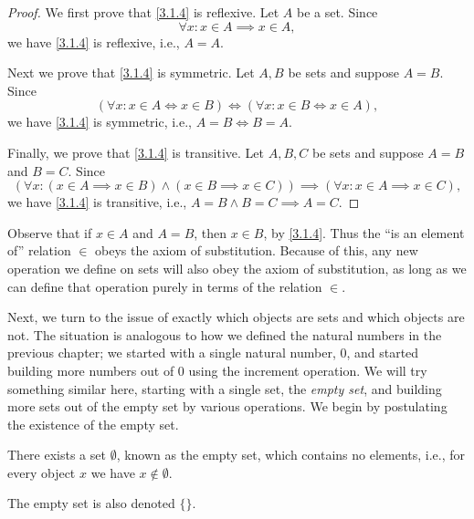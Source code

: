 \begin{proof}
  We first prove that \cref{3.1.4} is reflexive.
  Let \(A\) be a set.
  Since
  \[
    \forall x : x \in A \implies x \in A,
  \]
  we have \cref{3.1.4} is reflexive, i.e., \(A = A\).

  Next we prove that \cref{3.1.4} is symmetric.
  Let \(A, B\) be sets and suppose \(A = B\).
  Since
  \[
    (\forall x : x \in A \iff x \in B) \iff (\forall x : x \in B \iff x \in A),
  \]
  we have \cref{3.1.4} is symmetric, i.e., \(A = B \iff B = A\).

  Finally, we prove that \cref{3.1.4} is transitive.
  Let \(A, B, C\) be sets and suppose \(A = B\) and \(B = C\).
  Since
  \[
    (\forall x : (x \in A \implies x \in B) \land (x \in B \implies x \in C)) \implies (\forall x : x \in A \implies x \in C),
  \]
  we have \cref{3.1.4} is transitive, i.e., \(A = B \land B = C \implies A = C\).
\end{proof}

\begin{note}
  Observe that if \(x \in A\) and \(A = B\), then \(x \in B\), by \cref{3.1.4}.
  Thus the ``is an element of'' relation \(\in\) obeys the axiom of substitution.
  Because of this, any new operation we define on sets will also obey the axiom of substitution, as long as we can define that operation purely in terms of the relation \(\in\).
\end{note}

\begin{note}
  Next, we turn to the issue of exactly which objects are sets and which objects are not.
  The situation is analogous to how we defined the natural numbers in the previous chapter;
  we started with a single natural number, \(0\), and started building more numbers out of \(0\) using the increment operation.
  We will try something similar here, starting with a single set, the \emph{empty set},
  and building more sets out of the empty set by various operations.
  We begin by postulating the existence of the empty set.
\end{note}

\begin{axiom}\label{3.2}
  There exists a set \(\emptyset\), known as the empty set, which contains no elements, i.e., for every object \(x\) we have \(x \notin \emptyset\).
\end{axiom}

\begin{note}
  The empty set is also denoted \(\{\}\).
\end{note}

